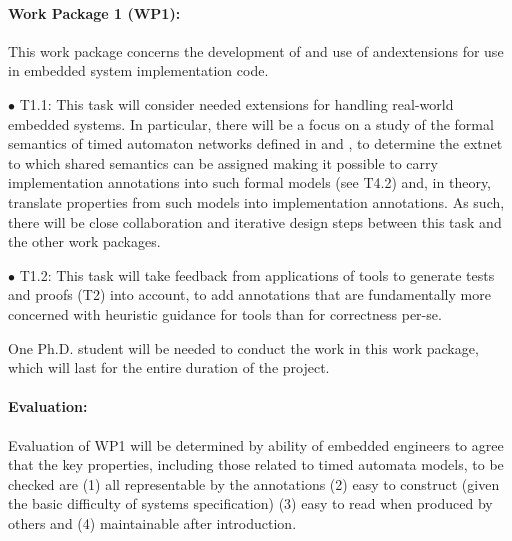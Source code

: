 \paragraph{Work Package 1 (WP1):}  This work package concerns the
development of and use of \acsl and\eacsl extensions for use in
embedded system implementation
code.


$\bullet$ T1.1: This task will consider needed extensions for handling
real-world embedded systems.  In particular, there will be a focus on
a study of the formal semantics of timed
automaton networks defined in \uppaal and \prism, to determine the
extnet to which shared semantics can be assigned making it possible to
carry implementation annotations into such formal models (see T4.2)
and, in theory, translate properties from such models into implementation annotations.  As such, there will be close collaboration and iterative design steps between this task and the other work packages. %

$\bullet$ T1.2: This task will take feedback from applications of
tools to generate tests and proofs (T2) into account, to add annotations
that are fundamentally more concerned with heuristic guidance for
tools than for correctness per-se.

One Ph.D. student will be needed to conduct the work in this work package, which will last for the entire duration of the project.

\paragraph{Evaluation:} Evaluation of
WP1 will be determined by ability of embedded engineers to agree that
the key properties, including those related to timed automata models, to be checked are (1) all representable by the
annotations (2) easy to construct (given the basic difficulty of
systems specification) (3) easy to read when produced by others and
(4) maintainable after introduction.

